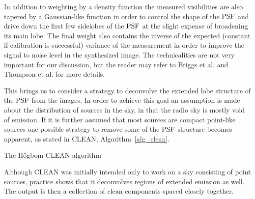 In addition to weighting by a density function the measured visibilities are also tapered by a Gaussian-like function in order to control the shape of the $\textrm{PSF}$ and
drive down the first few sidelobes of the $\textrm{PSF}$ at the slight expense of broadening its main lobe. The final weight also contains the inverse of the expected 
(constant if calibration is successful) variance of the measurement in order to improve the signal to noise level in the synthesized image. The technicalities are
not very important for our discussion, but the reader may refer to Briggs et al. \cite[Lecture 7]{taylor1999synthesis} and Thompson et al. \cite[p. 387-399]{thompson2008interferometry} for 
more details.

This brings us to consider a strategy to deconvolve the extended lobe structure of the $\textrm{PSF}$ from the images. In order to achieve this goal an assumption is made about the distribution of sources in the sky, in that the radio
sky is mostly void of emission. If it is further assumed that most sources are compact point-like sources one possible strategy to remove some of the $\textrm{PSF}$ structure becomes apparent, as stated in CLEAN, Algorithm~\ref{alg_clean}.
\begin{algorithm}
  \begin{algorithmic}
  \REPEAT
  \end{algorithmic}
  \caption{The H\"ogbom CLEAN algorithm}
  \label{alg_clean}
\end{algorithm}

Although CLEAN was initially intended only to work on a sky consisting of point sources, practice shows that it
deconvolves regions of extended emission as well. The output is then a collection of clean components spaced closely
together. 

